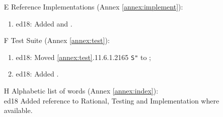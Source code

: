 \begin{itemize}
	\item[E] Reference Implementations (Annex \ref{annex:implement}): %
	\begin{enumerate}
		\item \textsf{ed18}: Added \iref{tools:[:}{} and \iref{tools:;]}{}.
	\end{enumerate}

	\item[F] Test Suite (Annex \ref{annex:test}):	%
	\begin{enumerate}
		\item \textsf{ed18}: Moved \ref{annex:test}.11.6.1.2165 \texttt{S"} to ;
	\item \textsf{ed18}: Added \tref{tools:[:}{}.
	\end{enumerate}
	
	\item[H] Alphabetic list of words (Annex \ref{annex:index}): \\%
		\textsf{ed18} Added reference to Rational, Testing and Implementation where available.
\end{itemize}


